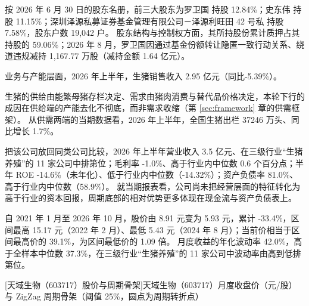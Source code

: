  按 2026 年 6 月 30 日的股东名册，前三大股东为罗卫国 持股 12.84\%；史东伟 持股 11.15\%；深圳泽源私募证券基金管理有限公司－泽源利旺田 42 号私 持股 7.58\%，股东户数 19,042 户。 股东结构与控制权方面，其所持股份累计质押占其持股的 59.06\%；2026 年 8 月，罗卫国因通过基金份额转让隐匿一致行动关系、绕道违规减持 1,167.77 万股（减持金额 1.64 亿元）。

 业务与产能层面，2026 年上半年，生猪销售收入 2.95 亿元（同比-5.39\%）。

 生猪的供给由能繁母猪存栏决定、需求由猪肉消费与替代品价格决定，本轮下行的成因在供给端的产能去化不彻底，而非需求收缩（第 \ref{sec:framework} 章的供需框架）。 从供需两端的当期数据看，2026 年上半年，全国生猪出栏 37246 万头、同比增长 1.7\%。

 把该公司放回同类公司比较，2026 年上半年营业收入 3.5 亿元、在三级行业“生猪养殖”的 11 家公司中排第位；毛利率 -1.0\%、高于行业内中位数 0.6 个百分点；半年 ROE -14.6\%（未年化）、低于行业内中位数（-14.32\%）；资产负债率 81.0\%、高于行业内中位数（58.9\%）。 就当期报表看，公司尚未把经营层面的特征转化为高于行业的资本回报，周期底部的相对优势更多体现在现金流与资产负债表上。

 自 2021 年 1 月至 2026 年 10 月，股价由 8.91 元变为 5.93 元，累计 -33.4\%，区间最高 15.17 元（2022 年 2 月）、最低 5.43 元（2024 年 8 月）；当前价相当于区间最高价的 39.1\%，为区间最低价的 1.09 倍。 月度收益的年化波动率 42.0\%，高于全样本中位数 37.3\%，在三级行业“生猪养殖”的 11 家公司中波动率由高到低排第位。

\begin{center}
\begin{minipage}{\textwidth}\centering
{}

[天域生物（603717）股价与周期骨架]{天域生物（603717）月度收盘价（元/股）与 ZigZag 周期骨架（阈值 25\%，圆点为周期转折点）}
\end{minipage}
\end{center}

